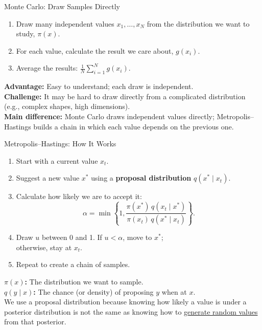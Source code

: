\documentclass[aspectratio=43,11pt]{beamer}
\begin{document}
\begin{frame}{Monte Carlo: Draw Samples Directly}
\small
\begin{enumerate}
\item Draw many independent values $x_1,\ldots,x_N$ from the distribution we want to study, $\pi(x)$.
\item For each value, calculate the result we care about, $g(x_i)$.
\item Average the results: $\frac{1}{N}\sum_{i=1}^N g(x_i)$.
\end{enumerate}
\vspace{0.25cm}
\textbf{Advantage:} Easy to understand; each draw is independent.\\[0.15cm]
\textbf{Challenge:} It may be hard to draw directly from a complicated distribution (e.g., complex shapes, high dimensions).\\[0.25cm]
\textbf{Main difference:} Monte Carlo draws independent values directly; Metropolis--Hastings builds a chain in which each value depends on the previous one.
\end{frame}

\begin{frame}{Metropolis--Hastings: How It Works}
\small
\begin{enumerate}
\item Start with a current value $x_t$.
\item Suggest a new value $x^*$ using a \textbf{proposal distribution} $q(x^*\mid x_t)$.
\item Calculate how likely we are to accept it:
\[
\alpha=\min\!\left\{1,\frac{\pi(x^*)\,q(x_t\mid x^*)}{\pi(x_t)\,q(x^*\mid x_t)}\right\}.
\]
\item Draw $u$ between 0 and 1. If $u<\alpha$, move to $x^*$;\\otherwise, stay at $x_t$.
\item Repeat to create a chain of samples.
\end{enumerate}
\vspace{0.1cm}
\textbf{$\pi(x)$:} The distribution we want to sample.\\
\textbf{$q(y\mid x)$:} The chance (or density) of proposing $y$ when at $x$.\\
{\footnotesize \textcolor{gray!85}{We use a proposal distribution because knowing how likely a value is under a posterior distribution is not the same as knowing how to \ul{generate random values} from that posterior.}}
\end{frame}
\end{document}

